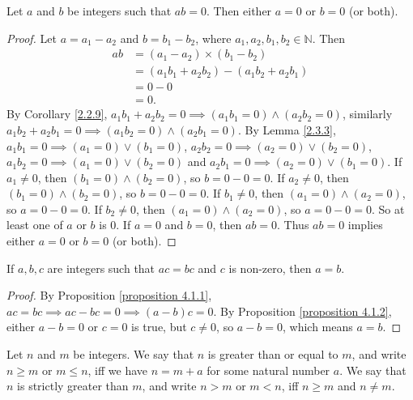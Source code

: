 \begin{proposition}\label{proposition 4.1.2}
Let \(a\) and \(b\) be integers such that \(ab = 0\).
Then either \(a = 0\) or \(b = 0\) (or both).
\end{proposition}

\begin{proof}
Let \(a = a_1 - a_2\) and \(b = b_1 - b_2\), where \(a_1, a_2, b_1, b_2 \in \mathds{N}\).
Then
\begin{align*}
ab &= (a_1 - a_2) \times (b_1 - b_2) \\
&= (a_1b_1 + a_2b_2) - (a_1b_2 + a_2b_1) \\
&= 0 - 0 \\
&= 0.
\end{align*} 
By Corollary \ref{2.2.9}, \(a_1b_1 + a_2b_2 = 0 \implies (a_1b_1 = 0) \land (a_2b_2 = 0)\), similarly \(a_1b_2 + a_2b_1 = 0 \implies (a_1b_2 = 0) \land (a_2b_1 = 0)\).
By Lemma \ref{2.3.3}, \(a_1b_1 = 0 \implies (a_1 = 0) \lor (b_1 = 0)\), \(a_2b_2 = 0 \implies (a_2 = 0) \lor (b_2 = 0)\), \(a_1b_2 = 0 \implies (a_1 = 0) \lor (b_2 = 0)\) and \(a_2b_1 = 0 \implies (a_2 = 0) \lor (b_1 = 0)\).
If \(a_1 \neq 0\), then \((b_1 = 0) \land (b_2 = 0)\), so \(b = 0 - 0 = 0\).
If \(a_2 \neq 0\), then \((b_1 = 0) \land (b_2 = 0)\), so \(b = 0 - 0 = 0\).
If \(b_1 \neq 0\), then \((a_1 = 0) \land (a_2 = 0)\), so \(a = 0 - 0 = 0\).
If \(b_2 \neq 0\), then \((a_1 = 0) \land (a_2 = 0)\), so \(a = 0 - 0 = 0\).
So at least one of \(a\) or \(b\) is \(0\).
If \(a = 0\) and \(b = 0\), then \(ab = 0\).
Thus \(ab = 0\) implies either \(a = 0\) or \(b = 0\) (or both).
\end{proof}

\begin{corollary}\label{corollary 4.1.1}
If \(a, b, c\) are integers such that \(ac = bc\) and \(c\) is non-zero, then \(a = b\).
\end{corollary}

\begin{proof}
By Proposition \ref{proposition 4.1.1}, \(ac = bc \implies ac - bc = 0 \implies (a - b)c = 0\).
By Proposition \ref{proposition 4.1.2}, either \(a - b = 0\) or \(c = 0\) is true, but \(c \neq 0\), so \(a - b = 0\), which means \(a = b\).
\end{proof}

\begin{definition}\label{definition 4.1.4}
Let \(n\) and \(m\) be integers.
We say that \(n\) is greater than or equal to \(m\), and write \(n \geq m\) or \(m \leq n\), iff we have \(n = m + a\) for some natural number \(a\).
We say that \(n\) is strictly greater than \(m\), and write \(n > m\) or \(m < n\), iff \(n \geq m\) and \(n \neq m\).
\end{definition}

